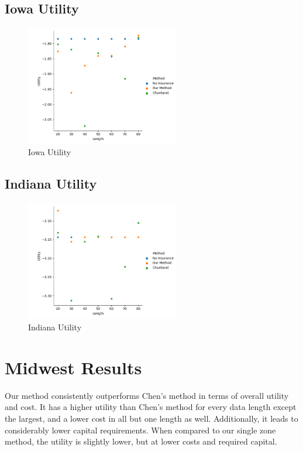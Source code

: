 \documentclass[11pt]{article}
\begin{document}
    \subsection{Iowa Utility}
    \begin{figure}[h]
        \centering
        \includegraphics[width=0.6\textwidth]{../../../output/figures/Evaluation 2/Iowa_Utility_Length_ml1.png}
        \caption{Iowa Utility}
    \end{figure}
    \FloatBarrier

    \subsection{Indiana Utility}
        \begin{figure}[h]
            \centering
            \includegraphics[width=0.6\textwidth]{../../../output/figures/Evaluation 2/Indiana_Utility_Length_ml1.png}
            \caption{Indiana Utility}
        \end{figure}
        \FloatBarrier
    
\section{Midwest Results}
  Our method consistently outperforms Chen's method in terms of overall utility and cost. It has a higher utility than Chen's method for every data length except the largest, and a lower cost in all but one length as well. Additionally, it leads to considerably lower capital requirements. When compared to our single zone method, the utility is slightly lower, but at lower costs and required capital. 
\end{document}
